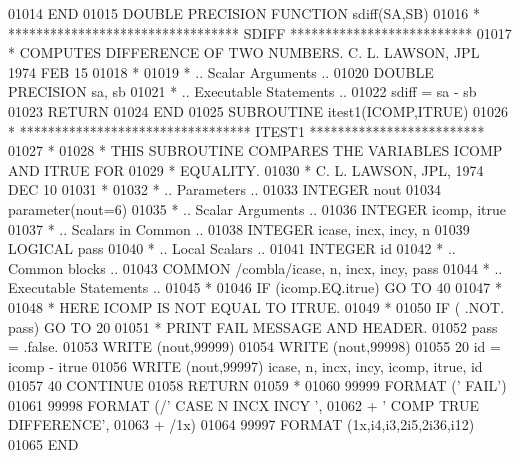 \begin{DoxyCode}
01014 \textcolor{keyword}{      END}
01015 \textcolor{keyword}{      DOUBLE PRECISION }\textcolor{keyword}{FUNCTION }sdiff(SA,SB)
01016 \textcolor{comment}{*     ********************************* SDIFF **************************}
01017 \textcolor{comment}{*     COMPUTES DIFFERENCE OF TWO NUMBERS.  C. L. LAWSON, JPL 1974 FEB 15}
01018 \textcolor{comment}{*}
01019 \textcolor{comment}{*     .. Scalar Arguments ..}
01020       \textcolor{keywordtype}{DOUBLE PRECISION}                sa, sb
01021 \textcolor{comment}{*     .. Executable Statements ..}
01022       sdiff = sa - sb
01023       \textcolor{keywordflow}{RETURN}
01024 \textcolor{keyword}{      END}
01025 \textcolor{keyword}{      SUBROUTINE }itest1(ICOMP,ITRUE)
01026 \textcolor{comment}{*     ********************************* ITEST1 *************************}
01027 \textcolor{comment}{*}
01028 \textcolor{comment}{*     THIS SUBROUTINE COMPARES THE VARIABLES ICOMP AND ITRUE FOR}
01029 \textcolor{comment}{*     EQUALITY.}
01030 \textcolor{comment}{*     C. L. LAWSON, JPL, 1974 DEC 10}
01031 \textcolor{comment}{*}
01032 \textcolor{comment}{*     .. Parameters ..}
01033       \textcolor{keywordtype}{INTEGER}           nout
01034       parameter(nout=6)
01035 \textcolor{comment}{*     .. Scalar Arguments ..}
01036       \textcolor{keywordtype}{INTEGER}           icomp, itrue
01037 \textcolor{comment}{*     .. Scalars in Common ..}
01038       \textcolor{keywordtype}{INTEGER}           icase, incx, incy, n
01039       \textcolor{keywordtype}{LOGICAL}           pass
01040 \textcolor{comment}{*     .. Local Scalars ..}
01041       \textcolor{keywordtype}{INTEGER}           id
01042 \textcolor{comment}{*     .. Common blocks ..}
01043       \textcolor{keyword}{COMMON}            /combla/icase, n, incx, incy, pass
01044 \textcolor{comment}{*     .. Executable Statements ..}
01045 \textcolor{comment}{*}
01046       \textcolor{keywordflow}{IF} (icomp.EQ.itrue) \textcolor{keywordflow}{GO TO} 40
01047 \textcolor{comment}{*}
01048 \textcolor{comment}{*                            HERE ICOMP IS NOT EQUAL TO ITRUE.}
01049 \textcolor{comment}{*}
01050       \textcolor{keywordflow}{IF} ( .NOT. pass) \textcolor{keywordflow}{GO TO} 20
01051 \textcolor{comment}{*                             PRINT FAIL MESSAGE AND HEADER.}
01052       pass = .false.
01053       \textcolor{keyword}{WRITE} (nout,99999)
01054       \textcolor{keyword}{WRITE} (nout,99998)
01055    20 id = icomp - itrue
01056       \textcolor{keyword}{WRITE} (nout,99997) icase, n, incx, incy, icomp, itrue, id
01057    40 \textcolor{keywordflow}{CONTINUE}
01058       \textcolor{keywordflow}{RETURN}
01059 \textcolor{comment}{*}
01060 99999 \textcolor{keyword}{FORMAT} (\textcolor{stringliteral}{'                                       FAIL'})
01061 99998 \textcolor{keyword}{FORMAT} (/\textcolor{stringliteral}{' CASE  N INCX INCY                               '},
01062      +       \textcolor{stringliteral}{' COMP                                TRUE     DIFFERENCE'},
01063      +       /1x)
01064 99997 \textcolor{keyword}{FORMAT} (1x,i4,i3,2i5,2i36,i12)
01065 \textcolor{keyword}{      END}
\end{DoxyCode}
